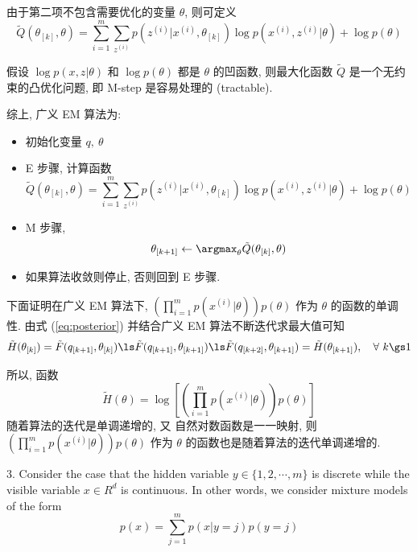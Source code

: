 \documentclass[openany]{ctexbook}
\theoremstyle{kaiti}
\theoremstyle{normal}
\begin{document}
由于第二项不包含需要优化的变量 $\theta$, 则可定义
\begin{equation}
  \tilde{Q}(\theta_{[k]},\theta)=\sum_{i=1}^m\sum_{z^{(i)}}p(z^{(i)}|x^{(i)},\theta_{[k]})\log p\left(x^{(i)},z^{(i)}|\theta\right)+\log p(\theta)
\end{equation}

假设 $\log p(x,z|\theta)$ 和 $\log p(\theta)$ 都是 $\theta$ 的凹函数, 则最大化函数 $\tilde{Q}$ 是一个无约束的凸优化问题, 即 M-step 是容易处理的 (tractable).

综上, 广义 EM 算法为:
\begin{itemize}
  \item 初始化变量 $q,~\theta$
  \item E 步骤, 计算函数 
    \begin{equation}
      \tilde{Q}(\theta_{[k]},\theta)=\sum_{i=1}^m\sum_{z^{(i)}}p(z^{(i)}|x^{(i)},\theta_{[k]})\log p\left(x^{(i)},z^{(i)}|\theta\right)+\log p(\theta)
    \end{equation}
  \item M 步骤, 
    \begin{equation}
      \theta_{[k+1]}\leftarrow\argmax_{\theta}\tilde{Q}(\theta_{[k]},\theta)
    \end{equation}
  \item 如果算法收敛则停止, 否则回到 E 步骤.
\end{itemize}

下面证明在广义 EM 算法下, $\displaystyle\left(\prod_{i = 1}^mp(x^{(i)}|\theta)\right)p(\theta)$ 作为 $\theta$ 的函数的单调性. 由式 (\ref{eq:posterior}) 并结合广义 EM 算法不断迭代求最大值可知
\begin{equation}
  \tilde{H}(\theta_{[k]})=\tilde{F}(q_{[k+1]},\theta_{[k]})\ls\tilde{F}(q_{[k+1]},\theta_{[k+1]})\ls\tilde{F}(q_{[k+2]},\theta_{[k+1]})=\tilde{H}(\theta_{[k+1]}),\quad\forall~k\gs1
\end{equation}

所以, 函数
\begin{equation*}
  \tilde{H}(\theta)=\log\left[\left(\prod_{i = 1}^mp(x^{(i)}|\theta)\right)p(\theta)\right]
\end{equation*}
随着算法的迭代是单调递增的, 又 自然对数函数是一一映射, 则 $\displaystyle\left(\prod_{i = 1}^mp(x^{(i)}|\theta)\right)p(\theta)$ 作为 $\theta$ 的函数也是随着算法的迭代单调递增的.

3. Consider the case that the hidden variable $y \in \{1,2,\cdots,m\}$ is discrete while the visible variable $x \in R^d$ is continuous. In other words, we consider mixture models of the form
\begin{equation}
	p(x) = \sum_{j = 1}^m p(x|y = j)p(y=j)
\end{equation}
\end{document}
